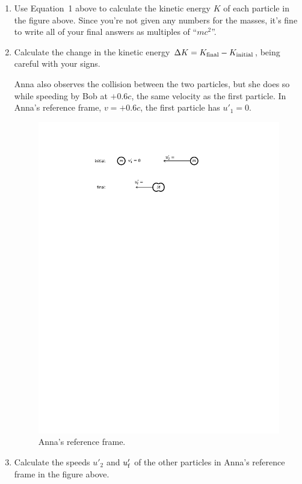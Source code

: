 \begin{enumerate}[labparts]
\item Use Equation~1 above to calculate the kinetic energy $K$ of each particle in the figure above.  Since you're not given any numbers for the masses, it's fine to write all of your final answers as multiples of ``$mc^2$''.
\answerspace{0.3in}

\item Calculate the change in the kinetic energy $\Delta K = K_{\rm final} - K_{\rm initial}$, being careful with your signs.  
\answerspace{0.3in}

\pagebreak

Anna also observes the collision between the two particles, but she does so while speeding by Bob at $+0.6c$, the same velocity as the first particle.  In Anna's reference frame, $v=+0.6c$, the first particle has $u'_1=0$.

\begin{figure}[h!]
\begin{center}
\includegraphics{energy_mass/collision_m_and_m_anna_no_k.pdf}
\caption{Anna's reference frame.}
\label{figure_collision_m_and_m_anna_no_k}
\end{center}
\end{figure}

\item Calculate the speeds $u'_2$ and $u'_{\rm f}$ of the other particles in Anna's reference frame in the figure above.
\answerspace{0.8in}

\end{enumerate}

